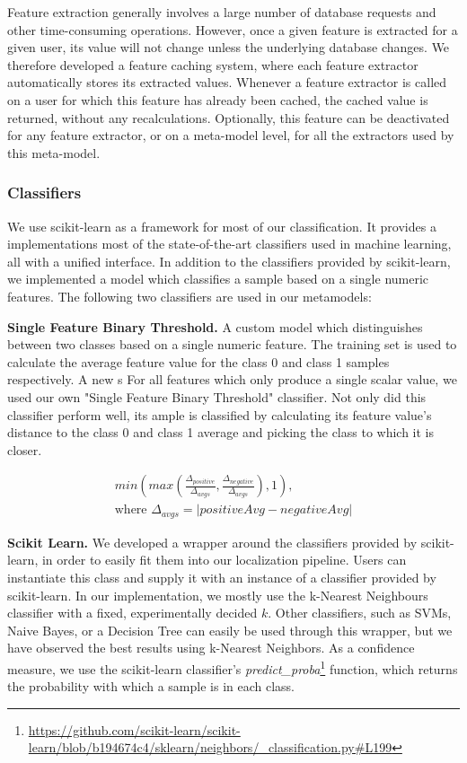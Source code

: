 \documentclass[10pt,a4paper]{article}
\begin{document}
Feature extraction generally involves a large number of database requests and other time-consuming operations. However, once a given feature is extracted for a given user, its value will not change unless the underlying database changes. We therefore developed a feature caching system, where each feature extractor automatically stores its extracted values. Whenever a feature extractor is called on a user for which this feature has already been cached, the cached value is returned, without any recalculations. Optionally, this feature can be deactivated for any feature extractor, or on a meta-model level, for all the extractors used by this meta-model.

\subsubsection{Classifiers}
We use scikit-learn as a framework for most of our classification. It provides a implementations most of the state-of-the-art classifiers used in machine learning, all with a unified interface. In addition to the classifiers provided by scikit-learn, we implemented a model which classifies a sample based on a single numeric features. The following two classifiers are used in our metamodels:

\textbf{Single Feature Binary Threshold.} A custom model which distinguishes between two classes based on a single numeric feature. The training set is used to calculate the average feature value for the class 0 and class 1 samples respectively. A new s For all features which only produce a single scalar value, we used our own "Single Feature Binary Threshold" classifier. Not only did this classifier perform well, its ample is classified by calculating its feature value's distance to the class 0 and class 1 average and picking the class to which it is closer.

\begin{equation}
\begin{split}
min(max(\frac{\Delta_{positive}}{\Delta_{avgs}}, \frac{\Delta_{negative}}{\Delta_{avgs}}), 1), \\
\text{where } \Delta_{avgs} = |positiveAvg - negativeAvg|
\end{split}
\end{equation}

\textbf{Scikit Learn.} We developed a wrapper around the classifiers provided by scikit-learn, in order to easily fit them into our localization pipeline. Users can instantiate this class and supply it with an instance of a classifier provided by scikit-learn. In our implementation, we mostly use the k-Nearest Neighbours classifier with a fixed, experimentally decided $k$. Other classifiers, such as SVMs, Naive Bayes, or a Decision Tree can easily be used through this wrapper, but we have observed the best results using k-Nearest Neighbors. As a confidence measure, we use the scikit-learn classifier's \textit{predict\_proba}\footnote{\href{https://github.com/scikit-learn/scikit-learn/blob/b194674c4/sklearn/neighbors/\_classification.py\#L199}{https://github.com/scikit-learn/scikit-learn/blob/b194674c4/sklearn/neighbors/\_classification.py\#L199}} function, which returns the probability with which a sample is in each class.
\end{document}
